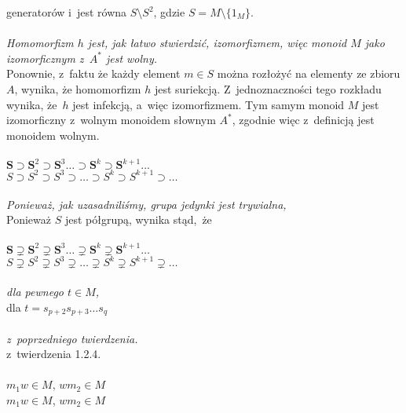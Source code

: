 \documentclass[a4paper,11pt]{article}
\begin{document}
\Powin generatorów i~jest równa $S \setminus S^{ 2 }$, gdzie
  $S = M \setminus \{ 1_{ M } \}$. \\
 \\
\Jest  \textit{Homomorfizm $h$ jest, jak łatwo stwierdzić, izomorfizmem,
  więc monoid $M$ jako izomorficznym z~$A^{ * }$ jest wolny.} \\
\Powin Ponownie, z~faktu że każdy element $m \in S$ można rozłożyć na
  elementy ze zbioru $A$, wynika, że homomorfizm $h$ jest suriekcją.
  Z~jednoznaczności tego rozkładu wynika, że~$h$ jest infekcją, a~więc
  izomorfizmem. Tym samym monoid $M$ jest izomorficzny z~wolnym monoidem
  słownym $A^{ * }$, zgodnie więc z~definicją jest monoidem wolnym. \\
 \\
\Jest  $\mathbf{S} \supset \mathbf{S}^{ 2 } \supset \mathbf{S}^{ 3 } \ldots
\supset \mathbf{S}^{ k } \supset \mathbf{S}^{ k + 1 } ...$ \\
\Powin $S \supset S^{ 2 } \supset S^{ 3 } \supset \ldots \supset S^{ k } \supset S^{ k + 1 } \supset \ldots$ \\
 \\
\Jest  \textit{Ponieważ, jak uzasadniliśmy, grupa jedynki jest trywialna,}
\\
\Powin Ponieważ $S$ jest półgrupą, wynika stąd,~że \\
 \\
\Jest  $\mathbf{S} \supsetneq \mathbf{S}^{ 2 } \supsetneq \mathbf{S}^{ 3 } \ldots
\supsetneq \mathbf{S}^{ k } \supsetneq \mathbf{S}^{ k + 1 } \ldots$ \\[0.3em]
\Powin $S \supsetneq S^{ 2 } \supsetneq S^{ 3 } \supsetneq \ldots \supsetneq S^{ k } \supsetneq S^{ k + 1 } \supsetneq \ldots$ \\
 \\
\Jest  \textit{dla pewnego $t \in M$,} \\
\Powin dla $t = s_{ p + 2 } s_{ p + 3 } \ldots s_{ q }$ \\
 \\
\Jest  \textit{z~poprzedniego twierdzenia.} \\
\Powin z~twierdzenia 1.2.4. \\
 \\
\Jest  $m_{ 1 } w \in M$,{ } $w m_{ 2 } \in M$ \\
\Powin $m_{ 1 } w \in M$, $w m_{ 2 } \in M$ \\
 \\
\end{document}
